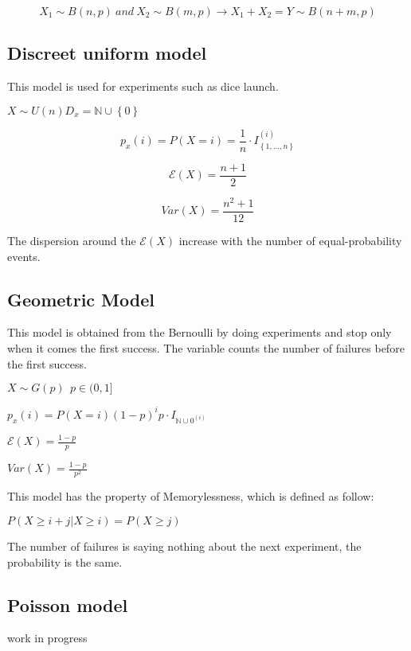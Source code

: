 \documentclass{article}
\begin{document}
$$X_1 \sim B(n,p) \ and \ X_2 \sim B(m,p) \rightarrow X_1 + X_2 = Y \sim B(n+m,p)$$


\subsection{Discreet uniform model}

This model is used for experiments such as dice launch.

$X \sim U(n) D_x = \mathbb{N} \cup \left\{0\right\}$

$$p_x(i) = P(X = i) = \frac{1}{n} \cdot I_\left\{1,...,n\right\}^(i)$$
\bigskip

$$\mathcal E(X) = \frac{n+1}{2}$$

$$Var(X) = \frac{n^2 +1}{12}$$

The dispersion around the $\mathcal E(X)$ increase with the number of equal-probability events.


\subsection{Geometric Model}

This model is obtained from the Bernoulli by doing experiments and stop only when it comes the first success. The variable counts the number of failures before the first success. 
\bigskip

$X \sim G(p) \ \ p \in (0,1]$

$p_x(i) = P(X=i) (1-p)^i p \cdot I_{\mathbb{N} \cup {0}^(i)}$
\bigskip

$\mathcal E(X) = \frac{1-p}{p}$

$Var(X) = \frac{1-p}{p^2}$
\bigskip

This model has the property of Memorylessness, which is defined as follow:

$P(X \geq i + j| X \geq i) = P(X \geq j)$

The number of failures is saying nothing about the next experiment, the probability is the same.

\subsection{Poisson model}
work in progress
\end{document}

